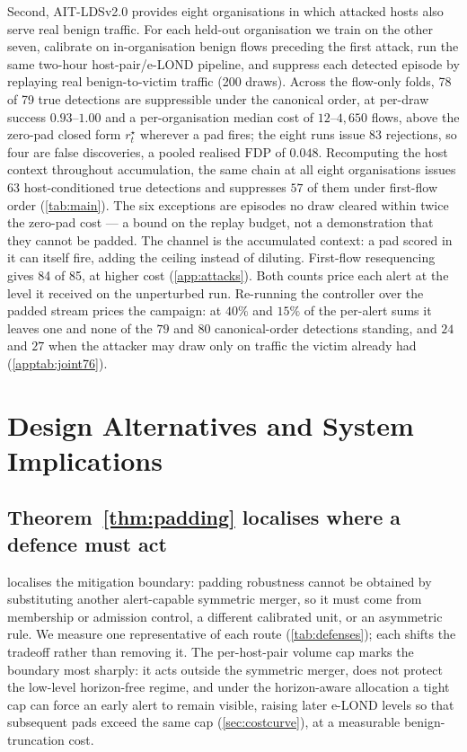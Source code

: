 \documentclass[conference]{IEEEtran}
\newcommand{\FDP}{\mathrm{FDP}}
\begin{document}
Second, AIT-LDSv2.0 provides eight organisations in which attacked hosts also serve real benign traffic.
For each held-out organisation we train on the other seven, calibrate on in-organisation benign flows
preceding the first attack, run the same two-hour host-pair/e-LOND pipeline, and suppress each detected
episode by replaying real benign-to-victim traffic (200 draws). Across the flow-only folds, 78 of 79
true detections are suppressible under the canonical order, at per-draw success $0.93$--$1.00$ and a
per-organisation median cost of $12$--$4{,}650$ flows, above the zero-pad closed form $r^{\star}_t$
wherever a pad fires; the eight runs issue $83$ rejections, so four are false discoveries, a pooled
realised $\FDP$ of $0.048$. Recomputing the host context throughout accumulation, the same chain at all
eight organisations issues $63$ host-conditioned true detections and suppresses $57$ of them under
first-flow order (\cref{tab:main}). The six exceptions are episodes no draw cleared within twice the
zero-pad cost --- a bound on the replay budget, not a demonstration that they cannot be padded. The
channel is the accumulated context: a pad scored in it can itself fire, adding the ceiling instead of
diluting.
First-flow resequencing gives 84 of 85, at higher cost (\cref{app:attacks}).
Both counts price each alert at the level it received on the unperturbed run. Re-running the controller
over the padded stream prices the campaign: at $40\%$ and $15\%$ of the per-alert sums it leaves one and
none of the $79$ and $80$ canonical-order detections standing, and $24$ and $27$ when the attacker may
draw only on traffic the victim already had (\cref{apptab:joint76}).


\section{Design Alternatives and System Implications}\label{sec:fixes}

\subsection{Theorem~\ref{thm:padding} localises where a defence must act}

 localises the mitigation boundary: padding robustness cannot be obtained by
substituting another alert-capable symmetric merger, so it must come from membership or admission
control, a different calibrated unit, or an asymmetric rule. We measure one representative of each
route (\cref{tab:defenses}); each shifts the tradeoff rather than removing it. The per-host-pair
volume cap marks the boundary most sharply: it acts outside the symmetric merger, does
not protect the low-level horizon-free regime, and under the horizon-aware allocation a tight cap can
force an early alert to remain visible, raising later e-LOND levels so that subsequent pads exceed the
same cap (\cref{sec:costcurve}), at a measurable benign-truncation cost.
\end{document}

